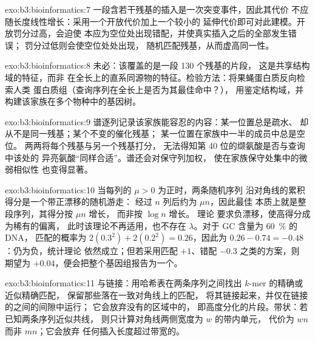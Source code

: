 \begin{solution}{exo:b3:bioinformatics:7}
一段含若干残基的插入是一次突变事件，因此其代价
不应随长度线性增长：采用一个开放代价加上一个较小的
延伸代价即可对此建模。开放罚分过高，会迫使
本应为空位处出现错配，并使真实插入之后的全部发生错误；
罚分过低则会使空位处处出现，
随机匹配残基，从而虚高同一性。
\end{solution}

\begin{solution}{exo:b3:bioinformatics:8}
未必：该覆盖的是一段 \num{130} 个残基的片段，
这是共享结构域的特征，而非
在全长上的直系同源物的特征。检验方法：将果蝇蛋白质反向检索人类
蛋白质组（查询序列在全长上是否为其最佳命中？），
用鉴定结构域，并
构建该家族在多个物种中的基因树。
\end{solution}

\begin{solution}{exo:b3:bioinformatics:9}
谱逐列记录该家族能容忍的内容：某一位置总是疏水、
却从不是同一残基；某个不变的催化残基；
某一位置在家族中一半的成员中总是空位。
两两将每个残基与另一个残基打分，
无法得知第 40 位的缬氨酸是否与查询中该处的
异亮氨酸“同样合适”。谱还会对保守列加权，
使在家族保守处集中的微弱相似性
也变得显著。
\end{solution}

\begin{solution}{exo:b3:bioinformatics:10}
当每列的 $\mu > 0$ 为正时，两条随机序列
沿对角线的累积得分是一个带正漂移的随机游走：
经过 $n$ 列后约为 $\mu n$，因此最佳
本质上就是整段序列，其得分按 $\mu n$ 增长，
而非按 $\log n$ 增长。 理论
要求负漂移，使高得分成为稀有的偏离，
此时该理论不再适用，也不存在 $\lambda$。对于 GC 含量为 \qty{60}{\%} 的 DNA，
匹配的概率为 $2(0.3^{2}) + 2(0.2^{2}) = 0.26$，因此为 $0.26 - 0.74 = -0.48$：仍为负，统计理论
依然成立；但若采用匹配 $+1$、错配 $-0.3$ 之类的方案，则
期望为 $+0.04$，便会把整个基因组报告为一个。
\end{solution}

\begin{solution}{exo:b3:bioinformatics:11}
与链接：用哈希表在两条序列之间找出 $k$-mer 的精确或近似精确匹配，
保留那些落在一致对角线上的匹配，
将其链接起来，并仅在链接的之间的间隙中运行；
它会放弃没有的区域中的，
即高度分化的片段。带状：若已知两条序列近似共线，
则只计算对角线两侧宽度为 $w$ 的带内单元，
代价为 $wn$ 而非 $mn$；它会放弃
任何插入长度超过带宽的。
\end{solution}

